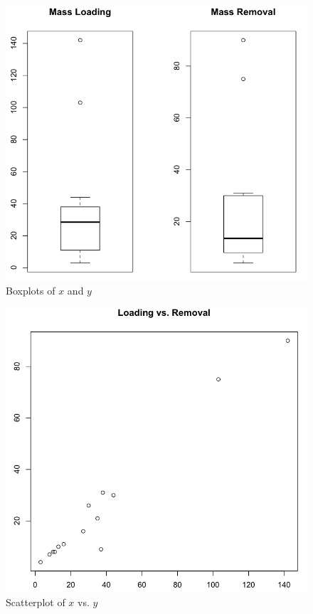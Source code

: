 \documentclass{article}
\begin{document}
	\clearpage
	\begin{figure}[htb]
	   \centering
	   \includegraphics[width=\textwidth]{img/Problem2a.jpg} 
	   \caption{Boxplots of $x$ and $y$}
	   \label{fig:boxplots}
	\end{figure}
	
	\begin{figure}[htb]
	   \centering
	   \includegraphics[width=\textwidth]{img/Problem2b.jpg} 
	   \caption{Scatterplot of $x$ vs. $y$}
	   \label{fig:scatterplot}
	\end{figure}
	
\end{document}
